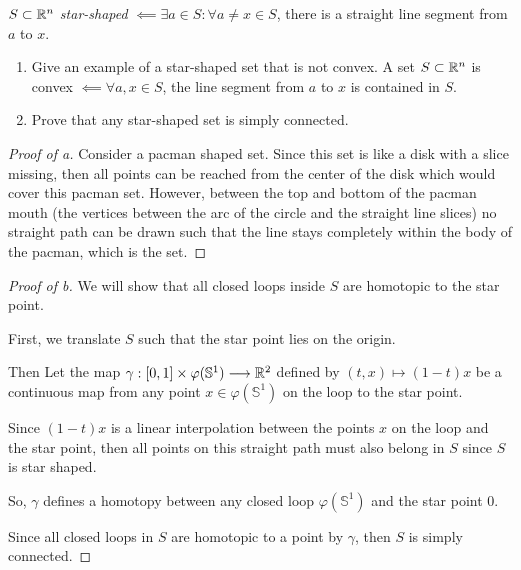\documentclass[../hw9]{subfiles}
\begin{document}
\begin{problem}[3]
$S\subset \mathbb{R}^{n}$ \textit{star-shaped} $\impliedby \exists a \in S : \forall a \neq x \in S$, there is a straight line segment from $a$ to  $x$.
\begin{enumerate}[label=(\alph*)]
	\item Give an example of a star-shaped set that is not convex.
	      A set $S\subset \mathbb{R}^{n}$ is convex $\impliedby \forall a,x \in S$, the line segment from $a$ to  $x$ is contained in  $S$.
	\item Prove that any star-shaped set is simply connected.
\end{enumerate}
\end{problem}
\begin{proof}[Proof of a]
	Consider a pacman shaped set.
	Since this set is like a disk with a slice missing, then all points can be reached from the center of the disk which would cover this pacman set.
	However, between the top and bottom of the pacman mouth (the vertices between the arc of the circle and the straight line slices) no straight path can be drawn such that the line stays completely within the body of the pacman, which is the set.
\end{proof}
\begin{proof}[Proof of b]
	We will show that all closed loops inside $S$ are homotopic to the star point.

	First, we translate $S$ such that the star point lies on the origin.

	Then Let the map $\gamma : [0,1]\times \varphi(\mathbb{S}^1)\longrightarrow \mathbb{R}^2$ defined by $(t,x) \mapsto (1-t)x$ be a continuous map from any point $x \in \varphi(\mathbb{S}^1)$ on the loop to the star point.

	Since $(1-t)x$ is a linear interpolation between the points $x$ on the loop and the star point, then all points on this straight path must also belong in $S$ since $S$ is star shaped.

	So, $\gamma$ defines a homotopy between any closed loop $\varphi(\mathbb{S}^1)$ and the star point 0.


	Since  all closed loops in $S$ are homotopic to a point by $\gamma$, then $S$ is simply connected.
\end{proof}
\end{document}

